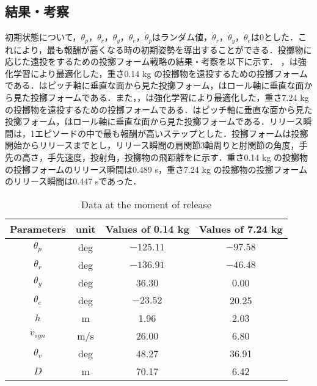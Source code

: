 \subsection{結果・考察}
初期状態について，$\theta_{p}$，$\theta_{r}$，$\theta_{y}$，$\theta_{e}$，$\dot{\theta}_{p}$はランダム値，$\dot{\theta}_{r}$，$\dot{\theta}_{y}$，$\dot{\theta}_{e}$は0とした．これにより，最も報酬が高くなる時の初期姿勢を導出することができる．投擲物に応じた遠投をするための投擲フォーム戦略の結果・考察を以下に示す．
，は強化学習により最適化した，重さ0.14 kg の投擲物を遠投するための投擲フォームである．はピッチ軸に垂直な面から見た投擲フォーム，はロール軸に垂直な面から見た投擲フォームである．また，，は強化学習により最適化した，重さ7.24 kg の投擲物を遠投するための投擲フォームである．はピッチ軸に垂直な面から見た投擲フォーム，はロール軸に垂直な面から見た投擲フォームである．リリース瞬間は，1エピソードの中で最も報酬が高いステップとした．投擲フォームは投擲開始からリリースまでとし，リリース瞬間の肩関節3軸周りと肘関節の角度，手先の高さ，手先速度，投射角，投擲物の飛距離をに示す．重さ0.14 kg の投擲物の投擲フォームのリリース瞬間は0.489 s，重さ7.24 kg の投擲物の投擲フォームのリリース瞬間は0.447 sであった．

\begin{table}[tb]
  \begin{center}
    \caption{Data at the moment of release}

    \begin{tabular}{c|c|c|c}
      \hline
      Parameters & unit & Values of 0.14 kg & Values of 7.24 kg \\
      \hline
      $\theta_{p}$ & deg & $-125.11$ & $-97.58$ \\
      $\theta_{r}$ & deg & $-136.91$ & $-46.48$ \\
      $\theta_{y}$ & deg  & 36.30 & 0.00 \\
      $\theta_{e}$ & deg & $-23.52$ & 20.25 \\
      $h$ & m & 1.96 & 2.03 \\
      $v_{syn}$ & m/s & 26.00 & 6.80 \\
      $\theta_{v}$ & deg & 48.27 & 36.91 \\
      $D$ & m & 70.17 & 6.42 \\
      \hline
    \end{tabular}
  \end{center}
\end{table}

